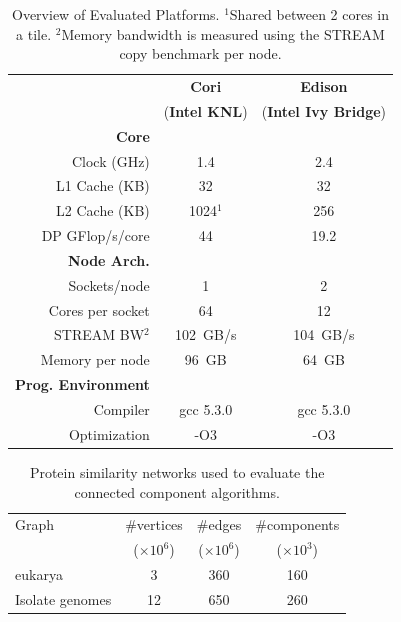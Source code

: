
{
\setlength{\tabcolsep}{5pt}
\begin{table}[!t]{
\centering
\begin{tabular}{rcc}
					&  {\bf Cori} & {\bf Edison }    \\
					& ({\bf Intel KNL})  & ({\bf Intel Ivy Bridge})		\\
\hline%
{\bf Core }	 	 & 			& \\

\hline%
Clock (GHz)			& 1.4			& 2.4					\\
L1 Cache (KB)		& 32		& 32				\\
L2 Cache (KB)		& 1024$^1$		& 256				\\
DP GFlop/s/core		& 44			&19.2		\\
\hline%
{\bf Node Arch.}	 	 & 			& \\
\hline%
Sockets/node			&  1		&	2					\\
Cores per socket			& 64				& 12					\\
STREAM BW$^2$		&  102~GB/s 	&	104~GB/s		\\
Memory per node		&  96~GB	&	64~GB			\\
\hline%
{\bf Prog. Environment}	 	 & 			& \\
\hline%
Compiler & gcc 5.3.0 & gcc 5.3.0\\
Optimization & -O3 &  -O3 \\
\hline%
\end{tabular}

\caption{Overview of Evaluated Platforms.  $^1$Shared between 2 cores in a tile. $^2$Memory bandwidth is measured using the STREAM copy benchmark per node.}
\label{tab:machines}
}
\end{table}
}


\begin{table}[!ht]
 \centering
 \caption{Protein similarity networks used to evaluate the connected component algorithms. 
}

 \begin{tabular}{@{} l c  c   c   @{}}
    \toprule
    
 Graph	&	\#vertices	&	\#edges &	 \#components \\
 &	($\times 10^6$)	&	($\times 10^6$) 	&	($\times 10^3$) \\

  \toprule

eukarya	&	3	&	360			& 160	\\
Isolate genomes	&	12	&	650			&	260		\\


   	       \toprule
  \end{tabular}
\label{table:problem-statistics}
 \end{table}



